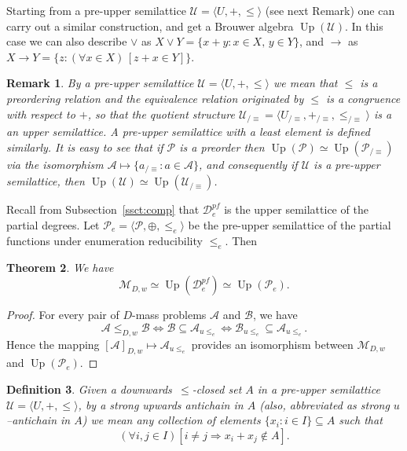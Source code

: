 \documentclass[11pt]{amsart}
\newtheorem{theorem}{Theorem}[section]
\newtheorem{defi}[theorem]{Definition}
\newenvironment{definition}{\begin{defi} \rm}{ \end{defi}}
\newtheorem{rem}[theorem]{Remark}
\newenvironment{remark}{\begin{rem} \rm}{ \end{rem}}
\DeclareMathOperator{\up}{Up}
\newcommand{\MP}[1]{\ensuremath{\mathcal{#1}}}
\newcommand{\QA}[1]{(\forall{#1})\,}
\begin{document}
Starting from a pre-upper semilattice $\mathscr{U} = \langle U,+,\le \rangle$ 
(see next Remark) one can carry out a similar construction, and get a Brouwer 
algebra $\up(\mathscr{U})$. In this case we can also describe $\lor$ as 
$X\lor Y=\{x+y: x \in X,\, y \in Y\}$, and $\rightarrow$ as $X\rightarrow 
Y=\{z: \QA{x \in X}[z+x\in Y]\}$.  

\begin{remark}\label{rem:iso-upsets}
By a \emph{pre-upper semilattice} $\mathscr{U} = \langle U,+,\le \rangle$ we 
mean that $\leq$ is a preordering relation and the equivalence relation 
originated by $\leq$ is a congruence with respect to $+$, so that the 
quotient structure $\mathscr{U}_{/\equiv} =\langle U_{/\equiv}, +_{/\equiv}, 
\leq_{/\equiv} \rangle$ is a an upper semilattice. A \emph{pre-upper 
semilattice with a least element} is defined similarly. It is easy to see 
that if $\mathscr{P}$ is a preorder then $\up(\mathscr{P}) \simeq 
\up(\mathscr{P}_{/\equiv})$ via the isomorphism $\mathcal{A} \mapsto 
\{a_{/\equiv}: a \in \mathcal{A}\}$, and consequently if $\mathscr{U}$ is a 
pre-upper semilattice, then $\up(\mathscr{U}) \simeq 
\up(\mathscr{U}_{/\equiv})$. 
\end{remark} 

Recall from Subsection~\ref{ssct:comp} that $\mathscr{D}_e^{pf}$ is the upper 
semilattice of the partial degrees. Let $\mathscr{P}_e= \langle 
\mathcal{P},\oplus, \leq_e \rangle$ be the pre-upper semilattice of the 
partial functions under enumeration reducibility $\leq_e$. Then

\begin{theorem}\label{thm:iso-usl-muchnik}
We have
\[
\mathscr{M}_{D,w} \simeq \up(\mathscr{D}_e^{pf}) 
\simeq \up(\mathscr{P}_e).
\]
\end{theorem}

\begin{proof}
For every pair of $D$-mass problems $\MP{A}$ and $\MP{B}$, we have 
\[
\MP{A} \leq_{D,w} \MP{B} \Leftrightarrow \MP{B} \subseteq 
\MP{A}_{u\leq_e}\Leftrightarrow 
\MP{B}_{u\leq_e} \subseteq \MP{A}_{u\leq_e}. 
\]
Hence the mapping $[\mathcal{A}]_{D,w} \mapsto \MP{A}_{u\leq_e}$ provides an 
isomorphism between $\mathscr{M}_{D,w}$ and $\up(\mathscr{P}_e)$. 
\end{proof}

\begin{definition}\cite[Definition~3.1]{Kuyper-Medvedev}\label{def:alpha0}
Given  a downwards~$\leq$-closed set $A$ in a pre-upper semilattice 
$\mathscr{U}=\langle U, +, \leq \rangle$, by a \emph{strong upwards antichain 
in $A$} (also, abbreviated as \emph{strong $u$--antichain in $A$}) we mean 
any collection of elements $\{x_i: i \in I\} \subseteq A$ such that 
\[
(\forall i,j \in I)[i \ne j \Rightarrow x_i + x_j \notin A].
\]
\end{definition}
\end{document}
